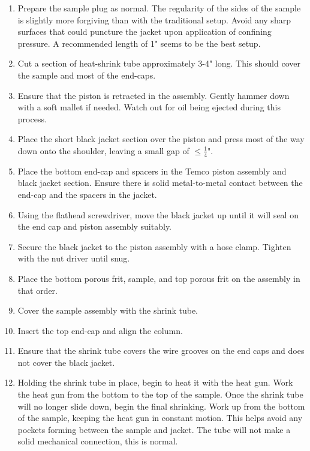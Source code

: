\begin{enumerate}

\item{Prepare the sample plug as normal.  The regularity of the sides of the sample is slightly more forgiving than with the traditional setup.  Avoid any sharp surfaces that could puncture the jacket upon application of confining pressure.  A recommended length of 1" seems to be the best setup.}

\item{Cut a section of heat-shrink tube approximately 3-4" long.  This should cover the sample and most of the end-caps.}

\item{Ensure that the piston is retracted in the assembly.  Gently hammer down with a soft mallet if needed.  Watch out for oil being ejected during this process.}

\item{Place the short black jacket section over the piston and press most of the way down onto the shoulder, leaving a small gap of $\leq \frac{1}{4}$".}

\item{Place the bottom end-cap  and spacers in the Temco piston assembly and black jacket section.  Ensure there is solid metal-to-metal contact between the end-cap and the spacers in the jacket.}

\item{Using the flathead screwdriver, move the black jacket up until it will seal on the end cap and piston assembly suitably.}

\item{Secure the black jacket to the piston assembly with a hose clamp.  Tighten with the nut driver until snug.}

\item{Place the bottom porous frit, sample, and top porous frit on the assembly in that order.}

\item{Cover the sample assembly with the shrink tube.}

\item{Insert the top end-cap and align the column.}

\item {Ensure that the shrink tube covers the wire grooves on the end caps and does not cover the black jacket.}

\item{Holding the shrink tube in place, begin to heat it with the heat gun.  Work the heat gun from the bottom to the top of the sample.  Once the shrink tube will no longer slide down, begin the final shrinking.  Work up from the bottom of the sample, keeping the heat gun in constant motion.  This helps avoid any pockets forming between the sample and jacket.  The tube will not make a solid mechanical connection, this is normal.}


\end{enumerate}
